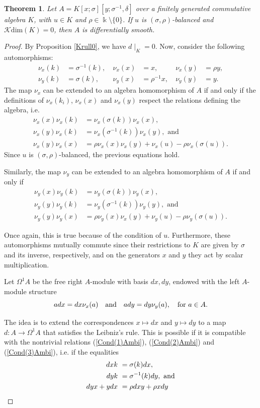 \documentclass{amsart}
\newtheorem{theorem}{Theorem}[section]
\theoremstyle{definition}
\theoremstyle{remark}
\numberwithin{equation}{section}
\begin{document}
\begin{theorem}\label{NoSigma}
Let $A = K[x; \sigma][y; \sigma^{-1}, \delta]$ over a finitely generated commutative algebra $K$, with $u\in K$ and $\rho\in\Bbbk\setminus\{0\}$. If $u$ is $(\sigma,\rho)$-balanced and $\mathcal{K}\text{dim}(K)=0$, then $A$ is differentially smooth.
\end{theorem}
\begin{proof}
By Proposition \ref{Krull0}, we have $d\mid_K =0$. Now, consider the following automorphisms:
\begin{align*}
    \nu_x(k) & =\sigma^{-1}(k), &\ \nu_{x}(x) &= x, &\ \nu_{x}(y) &=\rho y, \\
    \nu_{y}(k) & =\sigma(k), &\ \nu_y(x) &=\rho^{-1}x, &\ \nu_{y}(y) &= y.
\end{align*}
The map $\nu_{x}$ can be extended to an algebra homomorphism of $A$ if and only if the definitions of $\nu_{x}(k_i)$, $\nu_{x}(x)$ and $\nu_{x}(y)$ respect the relations defining the algebra, i.e.
\begin{align*}
   \nu_x(x)\nu_x(k) & =\nu_x(\sigma(k))\nu_x(x), \\
   \nu_x(y)\nu_x(k) &= \nu_x(\sigma^{-1}(k))\nu_x(y), \text{ and } \\
   \nu_x(y)\nu_x(x) &=\rho\nu_x(x)\nu_x(y)+\nu_x(u)-\rho\nu_x(\sigma(u)).
\end{align*}
Since $u$ is $(\sigma,\rho)$-balanced, the previous equations hold.

Similarly, the map $\nu_{y}$ can be extended to an algebra homomorphism of $A$ if and only if
\begin{align*}
   \nu_y(x)\nu_y(k) & =\nu_y(\sigma(k))\nu_y(x), \\
   \nu_y(y)\nu_y(k) &= \nu_y(\sigma^{-1}(k))\nu_y(y), \text{ and } \\
   \nu_y(y)\nu_y(x) &=\rho\nu_y(x)\nu_x(y)+\nu_y(u)-\rho\nu_y(\sigma(u)).
\end{align*}

Once again, this is true because of the condition of $u$. Furthermore, these automorphisms mutually commute since their restrictions to $K$ are given by $\sigma$ and its inverse, respectively, and on the generators $x$ and $y$ they act by scalar multiplication.

Let $\Omega^{1}A$ be the free right $A$-module with basis $dx,dy$, endowed with the left
$A$-module structure
\[
adx=dx\nu_{x}(a) \quad {\rm and} \quad ady=dy\nu_{y}(a), \quad {\rm for} \, \, a\in A.
\]

The idea is to extend the correspondences $x \mapsto d x$ and $y\mapsto d y$ to a map \linebreak $d: A \to \Omega^{1} A$ that satisfies the Leibniz's rule. This is possible if it is compatible with the nontrivial relations {\rm (}\ref{Cond(1)Ambi}{\rm )}, {\rm (}\ref{Cond(2)Ambi}{\rm )} and {\rm (}\ref{Cond(3)Ambi}{\rm )}, i.e. if the equalities
\begin{align*}
        dxk &\ = \sigma(k)dx, \\
        dyk &\ = \sigma^{-1}(k)dy,\ {\rm and} \\
        dyx+ydx &\ = \rho dxy+\rho xdy
\end{align*}


\end{proof}
\end{document}
